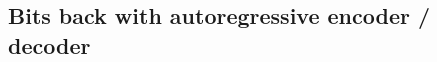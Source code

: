 \documentclass[preprint,notitlepage]{revtex4-1}
\begin{document}
\subsection{Bits back with autoregressive encoder / decoder}


\begin{comment}

\section{Invertible Architectures}

MintNet

Unconstrained Monotonic Neural Networks

\subsection{Invertible ResNets}

iResNet paper and friends....

\subsection{Invertible Activations}

\cite{Finzi:aa} use SneakyReLU which seems like a very simple approach. Can additionally learn leaky parameter. Nice thing about this is that it allows the system to learn linear transformations if desired.


\subsection{Fixed point iteration}


\subsection{Autoregressive methods}

As explained in Ref.~\cite{Hoogeboom:2019ab}, an inverse of an autoregressive convolution can be achieved in $O(N^2)$ in the size of the input, as it has to be done sequentially. In their code there is a Cython implementation of a parallel inversion module, and they maintain a small dimension

\subsection{Fourier Methods}

Refs.~\cite{Karami:2018aa,Hoogeboom:2019ab,Finzi:aa,Karami:aa} use Fourier methods to invert convolutions.


\end{comment}
\end{document}

